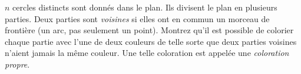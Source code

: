 $n$ cercles distincts sont donnés dans le plan. Ils divisent le plan en
plusieurs parties. Deux parties sont \emph{voisines} si elles ont en commun un
morceau de frontière (un arc, pas seulement un point). Montrez qu'il est
possible de colorier chaque partie avec l'une de deux couleurs de telle sorte
que deux parties voisines n'aient jamais la même couleur. Une telle coloration est appelée une
\emph{coloration propre}.
